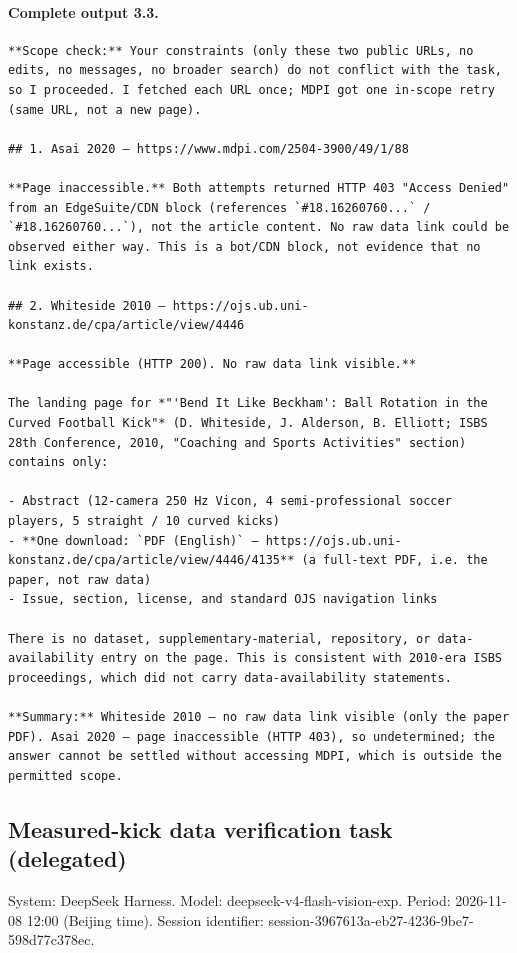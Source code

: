 \documentclass[UTF8,10pt]{ctexart}
\begin{document}
\paragraph{Complete output 3.3.}
\begin{Verbatim}[breaklines=true,breakanywhere=true,fontsize=\scriptsize,frame=single,framesep=2pt]
**Scope check:** Your constraints (only these two public URLs, no edits, no messages, no broader search) do not conflict with the task, so I proceeded. I fetched each URL once; MDPI got one in-scope retry (same URL, not a new page).

## 1. Asai 2020 — https://www.mdpi.com/2504-3900/49/1/88

**Page inaccessible.** Both attempts returned HTTP 403 "Access Denied" from an EdgeSuite/CDN block (references `#18.16260760...` / `#18.16260760...`), not the article content. No raw data link could be observed either way. This is a bot/CDN block, not evidence that no link exists.

## 2. Whiteside 2010 — https://ojs.ub.uni-konstanz.de/cpa/article/view/4446

**Page accessible (HTTP 200). No raw data link visible.**

The landing page for *"'Bend It Like Beckham': Ball Rotation in the Curved Football Kick"* (D. Whiteside, J. Alderson, B. Elliott; ISBS 28th Conference, 2010, "Coaching and Sports Activities" section) contains only:

- Abstract (12-camera 250 Hz Vicon, 4 semi-professional soccer players, 5 straight / 10 curved kicks)
- **One download: `PDF (English)` — https://ojs.ub.uni-konstanz.de/cpa/article/view/4446/4135** (a full-text PDF, i.e. the paper, not raw data)
- Issue, section, license, and standard OJS navigation links

There is no dataset, supplementary-material, repository, or data-availability entry on the page. This is consistent with 2010-era ISBS proceedings, which did not carry data-availability statements.

**Summary:** Whiteside 2010 — no raw data link visible (only the paper PDF). Asai 2020 — page inaccessible (HTTP 403), so undetermined; the answer cannot be settled without accessing MDPI, which is outside the permitted scope.
\end{Verbatim}

\subsection*{Measured-kick data verification task (delegated)}
\noindent System: DeepSeek Harness. Model: deepseek-v4-flash-vision-exp. Period: 2026-11-08 12:00 (Beijing time). Session identifier: session-3967613a-eb27-4236-9be7-598d77c378ec.
\end{document}
